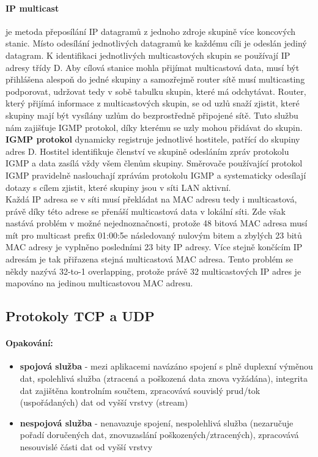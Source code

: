 \documentclass[10pt,a4paper]{article}
\begin{document}
\paragraph{IP multicast} je metoda přeposílání IP datagramů z jednoho zdroje skupině více koncových stanic. Místo odesílání jednotlivých datagramů ke každému cíli je odeslán jediný datagram. K identifikaci jednotlivých multicastových skupin se používají IP adresy třídy D. Aby cílová stanice mohla přijímat multicastová data, musí být přihlášena alespoň do jedné skupiny a samozřejmě router sítě musí multicasting podporovat, udržovat tedy v sobě tabulku skupin, které má odchytávat. Router, který přijímá informace z multicastových skupin, se od uzlů snaží zjistit, které skupiny mají být vysílány uzlům do bezprostředně připojené sítě. Tuto službu nám zajišťuje IGMP protokol, díky kterému se uzly mohou přidávat do skupin. \\
\textbf{IGMP protokol} dynamicky registruje jednotlivé hostitele, patřící do skupiny adres D. Hostitel identifikuje členství ve skupině odesláním zpráv protokolu IGMP a data zasílá vždy všem členům skupiny. Směrovače používající protokol IGMP pravidelně naslouchají zprávám protokolu IGMP a systematicky odesílají dotazy s cílem zjistit, které skupiny jsou v síti LAN aktivní. \\
Každá IP adresa se v síti musí překládat na MAC adresu tedy i multicastová, právě díky této adrese se přenáší multicastová data v lokální síti. Zde však nastává problém v možné nejednoznačnosti, protože 48 bitová MAC adresa musí mít pro multicast prefix 01:00:5e následovaný nulovým bitem a zbylých 23 bitů MAC adresy je vyplněno posledními 23 bity IP adresy. Více stejně končícím IP adresám je tak přiřazena stejná multicastová MAC adresa. Tento problém se někdy nazývá 32-to-1 overlapping, protože právě 32 multicastových IP adres je mapováno na jedinou multicastovou MAC adresu.




\subsection{Protokoly TCP a UDP}
\paragraph{Opakování:}
\begin{itemize}
	\item \textbf{spojová služba} - mezi aplikacemi navázáno spojení s plně duplexní výměnou dat, spolehlivá služba (ztracená a poškozená data znova vyžádána), integrita dat zajištěna kontrolním součtem, zpracovává souvislý prud/tok (uspořádaných) dat od vyšší vrstvy (stream)
	\item \textbf{nespojová služba} - nenavazuje spojení, nespolehlivá služba (nezaručuje pořadí doručených dat, znovuzaslání poškozených/ztracených), zpracovává nesouvislé části dat od vyšší vrstvy
\end{itemize}
\end{document}
